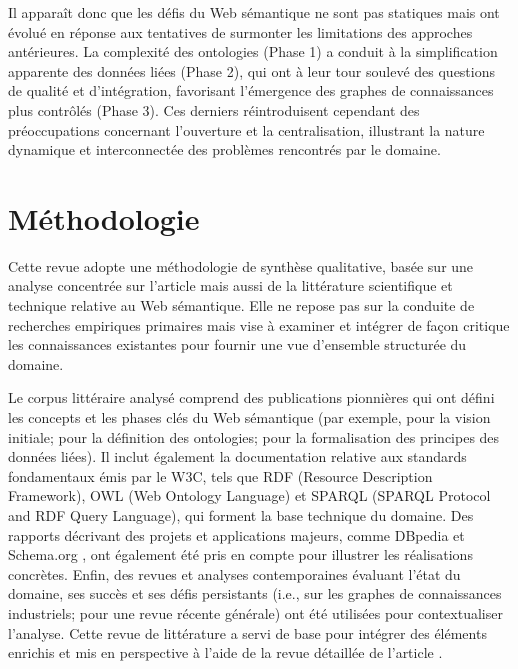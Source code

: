 \documentclass[9pt,twocolumn,twoside,french]{opticajnl}
\begin{document}
Il apparaît donc que les défis du Web sémantique ne sont pas statiques mais ont évolué en réponse aux tentatives de surmonter les limitations des approches antérieures. La complexité des ontologies (Phase 1) a conduit à la simplification apparente des données liées (Phase 2), qui ont à leur tour soulevé des questions de qualité et d'intégration, favorisant l'émergence des graphes de connaissances plus contrôlés (Phase 3). Ces derniers réintroduisent cependant des préoccupations concernant l'ouverture et la centralisation, illustrant la nature dynamique et interconnectée des problèmes rencontrés par le domaine.




\section{Méthodologie}
Cette revue adopte une méthodologie de synthèse qualitative, basée sur une analyse concentrée sur l'article mais aussi de la littérature scientifique et technique relative au Web sémantique. Elle ne repose pas sur la conduite de recherches empiriques primaires mais vise à examiner et intégrer de façon critique les connaissances existantes pour fournir une vue d'ensemble structurée du domaine.

Le corpus littéraire analysé comprend des publications pionnières qui ont défini les concepts et les phases clés du Web sémantique (par exemple, \citealp{BernersLee2001} pour la vision initiale; \citealp{Gruber1993A} pour la définition des ontologies; \citealp{Bizer2009Linked} pour la formalisation des principes des données liées). Il inclut également la documentation relative aux standards fondamentaux émis par le W3C, tels que RDF (Resource Description Framework), OWL (Web Ontology Language) et SPARQL (SPARQL Protocol and RDF Query Language), qui forment la base technique du domaine. Des rapports décrivant des projets et applications majeurs, comme DBpedia \citep{Lehmann2015Dbpediaa} et Schema.org \citep{Guha2015Schemaorg}, ont également été pris en compte pour illustrer les réalisations concrètes. Enfin, des revues et analyses contemporaines évaluant l'état du domaine, ses succès et ses défis persistants (i.e., \citealp{Noy2019Industryscale} sur les graphes de connaissances industriels; \citealp{Hitzler2021} pour une revue récente générale) ont été utilisées pour contextualiser l'analyse. Cette revue de littérature a servi de base pour intégrer des éléments enrichis et mis en perspective à l'aide de la revue détaillée de l'article \citet{Hitzler2021}.
\end{document}
